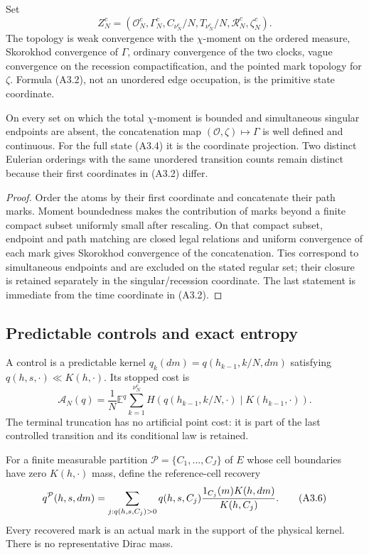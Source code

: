 Set
\[
 Z_N^c=(\mathcal O_N^c,\Gamma_N^c,
        C_{\nu_N^c}/N,T_{\nu_N^c}/N,
        \mathcal R_N^c,\zeta_N^c).                        \tag{A3.4}
\]
The topology is weak convergence with the $\chi$-moment on the ordered
measure, Skorokhod convergence of $\Gamma$, ordinary convergence of the two
clocks, vague convergence on the recession compactification, and the pointed
mark topology for $\zeta$.  Formula (A3.2), not an unordered edge occupation,
is the primitive state coordinate.

\begin{proposition}
\label{prop:r23-a3-order}
On every set on which the total $\chi$-moment is bounded and simultaneous
singular endpoints are absent, the concatenation map
$(\mathcal O,\zeta)\mapsto\Gamma$ is well defined and continuous.  For the
full state (A3.4) it is the coordinate projection.  Two distinct Eulerian
orderings with the same unordered transition counts remain distinct because
their first coordinates in (A3.2) differ.
\end{proposition}

\begin{proof}
Order the atoms by their first coordinate and concatenate their path marks.
Moment boundedness makes the contribution of marks beyond a finite compact
subset uniformly small after rescaling.  On that compact subset, endpoint and
path matching are closed legal relations and uniform convergence of each
mark gives Skorokhod convergence of the concatenation.  Ties correspond to
simultaneous endpoints and are excluded on the stated regular set; their
closure is retained separately in the singular/recession coordinate.  The
last statement is immediate from the time coordinate in (A3.2).
\end{proof}

\subsection{Predictable controls and exact entropy}

A control is a predictable kernel
$q_k(dm)=q(h_{k-1},k/N,dm)$ satisfying
$q(h,s,\cdot)\ll K(h,\cdot)$.  Its stopped cost is
\[
 \mathcal A_N(q)=\frac1N
 \mathbb E^q\sum_{k=1}^{\nu_N^c}
 H(q(h_{k-1},k/N,\cdot)\mid K(h_{k-1},\cdot)).            \tag{A3.5}
\]
The terminal truncation has no artificial point cost: it is part of the last
controlled transition and its conditional law is retained.

For a finite measurable partition $\mathcal P=\{C_1,\ldots,C_J\}$ of $E$
whose cell boundaries have zero $K(h,\cdot)$ mass, define the reference-cell
recovery
\[
 q^{\mathcal P}(h,s,dm)=
 \sum_{j:q(h,s,C_j)>0}q(h,s,C_j)
 {1_{C_j}(m)K(h,dm)\over K(h,C_j)}.                       \tag{A3.6}
\]
Every recovered mark is an actual mark in the support of the physical kernel.
There is no representative Dirac mass.

